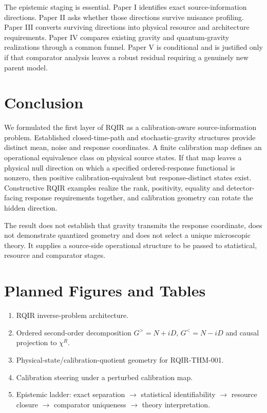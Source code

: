 \documentclass[11pt]{article}
\begin{document}
The epistemic staging is essential. Paper I identifies exact source-information directions. Paper II asks whether those directions survive nuisance profiling. Paper III converts surviving directions into physical resource and architecture requirements. Paper IV compares existing gravity and quantum-gravity realizations through a common funnel. Paper V is conditional and is justified only if that comparator analysis leaves a robust residual requiring a genuinely new parent model.

\section{Conclusion}

We formulated the first layer of RQIR as a calibration-aware source-information problem. Established closed-time-path and stochastic-gravity structures provide distinct mean, noise and response coordinates. A finite calibration map defines an operational equivalence class on physical source states. If that map leaves a physical null direction on which a specified ordered-response functional is nonzero, then positive calibration-equivalent but response-distinct states exist. Constructive RQIR examples realize the rank, positivity, equality and detector-facing response requirements together, and calibration geometry can rotate the hidden direction.

The result does not establish that gravity transmits the response coordinate, does not demonstrate quantized geometry and does not select a unique microscopic theory. It supplies a source-side operational structure to be passed to statistical, resource and comparator stages.

\section*{Planned Figures and Tables}

\begin{enumerate}
 \item RQIR inverse-problem architecture.
 \item Ordered second-order decomposition $G^>=N+iD$, $G^<=N-iD$ and causal projection to $\chi^R$.
 \item Physical-state/calibration-quotient geometry for RQIR-THM-001.
 \item Calibration steering under a perturbed calibration map.
 \item Epistemic ladder: exact separation $\to$ statistical identifiability $\to$ resource closure $\to$ comparator uniqueness $\to$ theory interpretation.
\end{enumerate}
\end{document}
